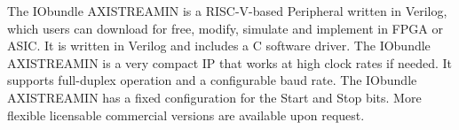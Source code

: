The IObundle AXISTREAMIN is a RISC-V-based Peripheral written in Verilog, which users
can download for free, modify, simulate and implement in FPGA or ASIC. It is
written in Verilog and includes a C software driver. The IObundle AXISTREAMIN is a very
compact IP that works at high clock rates if needed. It supports full-duplex
operation and a configurable baud rate. The IObundle AXISTREAMIN has a fixed
configuration for the Start and Stop bits. More flexible licensable commercial
versions are available upon request.



